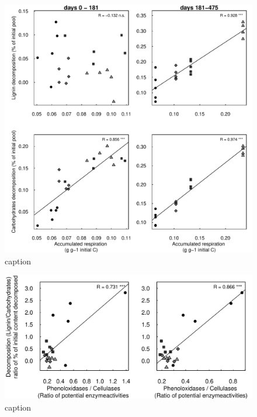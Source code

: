 \documentclass[10pt]{article}
\begin{document}
\newpage
\begin{figure}[h!]
\vspace*{2mm}
\begin{center}
\includegraphics{plosone-respcorr}
\end{center}
\caption{caption}
\label{fig:repcor}
\end{figure}

\newpage
\begin{figure}[h!]
\vspace*{2mm}
\begin{center}
\includegraphics{plosone-enzcorr}
\end{center}
\caption{caption}
\label{fig:enzcor}
\end{figure}
\end{document}
